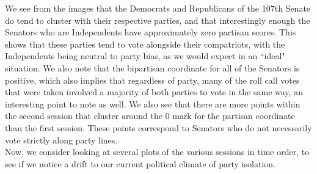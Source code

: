 \documentclass[letterpaper,12pt]{article}
\begin{document}
We see from the images that the Democrats and Republicans of the 107th Senate do tend to cluster with their respective parties, and that interestingly enough the Senators who are Independents have approximately zero partisan scores. This shows that these parties tend to vote alongside their compatriots, with the Independents being neutral to party bias, as we would expect in an ``ideal" situation. We also note that the bipartisan coordinate for all of the Senators is positive, which also implies that regardless of party, many of the roll call votes that were taken involved a majority of both parties to vote in the same way, an interesting point to note as well. We also see that there are more points within the second session that cluster around the 0 mark for the partisan coordinate than the first session. These points correspond to Senators who do not necessarily vote strictly along party lines.\\
Now, we consider looking at several plots of the various sessions in time order, to see if we notice a drift to our current political climate of party isolation.
\end{document}
